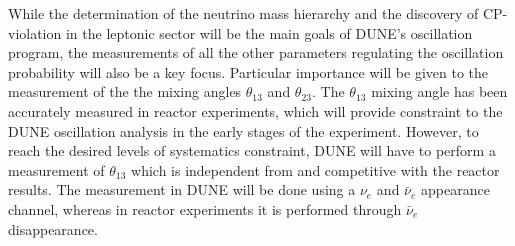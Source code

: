While the determination of the neutrino mass hierarchy and the discovery of CP-violation in the leptonic sector will be the main goals of DUNE's oscillation program, the measurements of all the other parameters regulating the oscillation probability will also be a key focus. Particular importance will be given to the measurement of the the mixing angles $\theta_{13}$ and $\theta_{23}$. The $\theta_{13}$  mixing angle has been accurately measured in reactor experiments, which will provide constraint to the DUNE oscillation analysis in the early stages of the experiment. However, to reach the desired levels of systematics constraint, DUNE will have to perform a measurement of $\theta_{13}$ which is independent from and competitive with the reactor results. The measurement in DUNE will be done using a $\nu_e$ and $\bar{\nu}_e$ appearance channel, whereas in reactor experiments it is performed through $\bar{\nu}_e$ disappearance.

